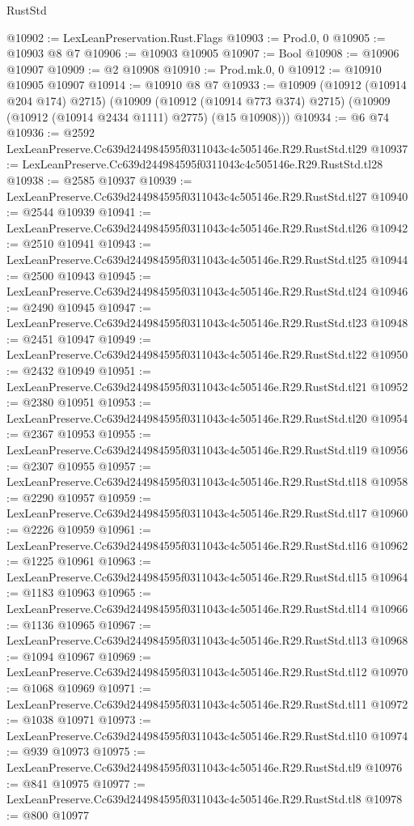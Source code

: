 \begin{lexlean}{RustStd}
\begin{coremodule}
@10902 := LexLeanPreservation.Rust.Flags
@10903 := Prod.{0, 0}
@10905 := @10903 @8 @7
@10906 := @10903 @10905
@10907 := Bool
@10908 := @10906 @10907
@10909 := @2 @10908
@10910 := Prod.mk.{0, 0}
@10912 := @10910 @10905 @10907
@10914 := @10910 @8 @7
@10933 := @10909
    (@10912 (@10914 @204 @174) @2715)
    (@10909
      (@10912 (@10914 @773 @374) @2715)
      (@10909 (@10912 (@10914 @2434 @1111) @2775) (@15 @10908)))
@10934 := @6 @74
@10936 := @2592 LexLeanPreserve.Cc639d244984595f0311043c4c505146e.R29.RustStd.tl29
@10937 := LexLeanPreserve.Cc639d244984595f0311043c4c505146e.R29.RustStd.tl28
@10938 := @2585 @10937
@10939 := LexLeanPreserve.Cc639d244984595f0311043c4c505146e.R29.RustStd.tl27
@10940 := @2544 @10939
@10941 := LexLeanPreserve.Cc639d244984595f0311043c4c505146e.R29.RustStd.tl26
@10942 := @2510 @10941
@10943 := LexLeanPreserve.Cc639d244984595f0311043c4c505146e.R29.RustStd.tl25
@10944 := @2500 @10943
@10945 := LexLeanPreserve.Cc639d244984595f0311043c4c505146e.R29.RustStd.tl24
@10946 := @2490 @10945
@10947 := LexLeanPreserve.Cc639d244984595f0311043c4c505146e.R29.RustStd.tl23
@10948 := @2451 @10947
@10949 := LexLeanPreserve.Cc639d244984595f0311043c4c505146e.R29.RustStd.tl22
@10950 := @2432 @10949
@10951 := LexLeanPreserve.Cc639d244984595f0311043c4c505146e.R29.RustStd.tl21
@10952 := @2380 @10951
@10953 := LexLeanPreserve.Cc639d244984595f0311043c4c505146e.R29.RustStd.tl20
@10954 := @2367 @10953
@10955 := LexLeanPreserve.Cc639d244984595f0311043c4c505146e.R29.RustStd.tl19
@10956 := @2307 @10955
@10957 := LexLeanPreserve.Cc639d244984595f0311043c4c505146e.R29.RustStd.tl18
@10958 := @2290 @10957
@10959 := LexLeanPreserve.Cc639d244984595f0311043c4c505146e.R29.RustStd.tl17
@10960 := @2226 @10959
@10961 := LexLeanPreserve.Cc639d244984595f0311043c4c505146e.R29.RustStd.tl16
@10962 := @1225 @10961
@10963 := LexLeanPreserve.Cc639d244984595f0311043c4c505146e.R29.RustStd.tl15
@10964 := @1183 @10963
@10965 := LexLeanPreserve.Cc639d244984595f0311043c4c505146e.R29.RustStd.tl14
@10966 := @1136 @10965
@10967 := LexLeanPreserve.Cc639d244984595f0311043c4c505146e.R29.RustStd.tl13
@10968 := @1094 @10967
@10969 := LexLeanPreserve.Cc639d244984595f0311043c4c505146e.R29.RustStd.tl12
@10970 := @1068 @10969
@10971 := LexLeanPreserve.Cc639d244984595f0311043c4c505146e.R29.RustStd.tl11
@10972 := @1038 @10971
@10973 := LexLeanPreserve.Cc639d244984595f0311043c4c505146e.R29.RustStd.tl10
@10974 := @939 @10973
@10975 := LexLeanPreserve.Cc639d244984595f0311043c4c505146e.R29.RustStd.tl9
@10976 := @841 @10975
@10977 := LexLeanPreserve.Cc639d244984595f0311043c4c505146e.R29.RustStd.tl8
@10978 := @800 @10977

\end{coremodule}
\end{lexlean}
